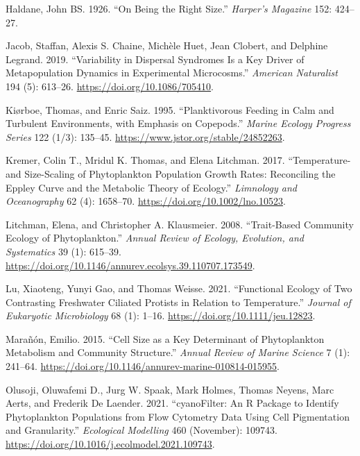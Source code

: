 \documentclass[
  letterpaper,
  DIV=11,
  numbers=noendperiod]{scrartcl}
\newlength{\cslhangindent}
\newenvironment{CSLReferences}[2] %
 {\begin{list}{}{%
  \setlength{\itemindent}{0pt}
  \setlength{\leftmargin}{0pt}
  \setlength{\parsep}{0pt}
  \ifodd #1
   \setlength{\leftmargin}{\cslhangindent}
   \setlength{\itemindent}{-1\cslhangindent}
  \fi
  \setlength{\itemsep}{#2\baselineskip}}}
 {\end{list}}
\begin{document}
\begin{CSLReferences}{1}{0}
Haldane, John BS. 1926. {``On Being the Right Size.''} \emph{Harper's
Magazine} 152: 424--27.

Jacob, Staffan, Alexis S. Chaine, Michèle Huet, Jean Clobert, and
Delphine Legrand. 2019. {``Variability in Dispersal Syndromes Is a Key
Driver of Metapopulation Dynamics in Experimental Microcosms.''}
\emph{American Naturalist} 194 (5): 613--26.
\url{https://doi.org/10.1086/705410}.

Kiørboe, Thomas, and Enric Saiz. 1995. {``Planktivorous Feeding in Calm
and Turbulent Environments, with Emphasis on Copepods.''} \emph{Marine
Ecology Progress Series} 122 (1/3): 135--45.
\url{https://www.jstor.org/stable/24852263}.

Kremer, Colin T., Mridul K. Thomas, and Elena Litchman. 2017.
{``Temperature- and Size-Scaling of Phytoplankton Population Growth
Rates: {Reconciling} the {Eppley} Curve and the Metabolic Theory of
Ecology.''} \emph{Limnology and Oceanography} 62 (4): 1658--70.
\url{https://doi.org/10.1002/lno.10523}.

Litchman, Elena, and Christopher A. Klausmeier. 2008. {``Trait-{Based
Community Ecology} of {Phytoplankton}.''} \emph{Annual Review of
Ecology, Evolution, and Systematics} 39 (1): 615--39.
\url{https://doi.org/10.1146/annurev.ecolsys.39.110707.173549}.

Lu, Xiaoteng, Yunyi Gao, and Thomas Weisse. 2021. {``Functional Ecology
of Two Contrasting Freshwater Ciliated Protists in Relation to
Temperature.''} \emph{Journal of Eukaryotic Microbiology} 68 (1): 1--16.
\url{https://doi.org/10.1111/jeu.12823}.

Marañón, Emilio. 2015. {``Cell {Size} as a {Key Determinant} of
{Phytoplankton Metabolism} and {Community Structure}.''} \emph{Annual
Review of Marine Science} 7 (1): 241--64.
\url{https://doi.org/10.1146/annurev-marine-010814-015955}.

Olusoji, Oluwafemi D., Jurg W. Spaak, Mark Holmes, Thomas Neyens, Marc
Aerts, and Frederik De Laender. 2021. {``{cyanoFilter}: {An R} Package
to Identify Phytoplankton Populations from Flow Cytometry Data Using
Cell Pigmentation and Granularity.''} \emph{Ecological Modelling} 460
(November): 109743.
\url{https://doi.org/10.1016/j.ecolmodel.2021.109743}.


\end{CSLReferences}
\end{document}
